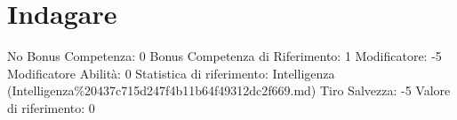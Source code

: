 \section{Indagare}\label{indagare}

\begin{description}
\tightlist
\item[Tags: ABI]
No Bonus Competenza: 0 Bonus Competenza di Riferimento: 1 Modificatore:
-5 Modificatore Abilità: 0 Statistica di riferimento: Intelligenza
(Intelligenza\%20437c715d247f4b11b64f49312dc2f669.md) Tiro Salvezza: -5
Valore di riferimento: 0
\end{description}
